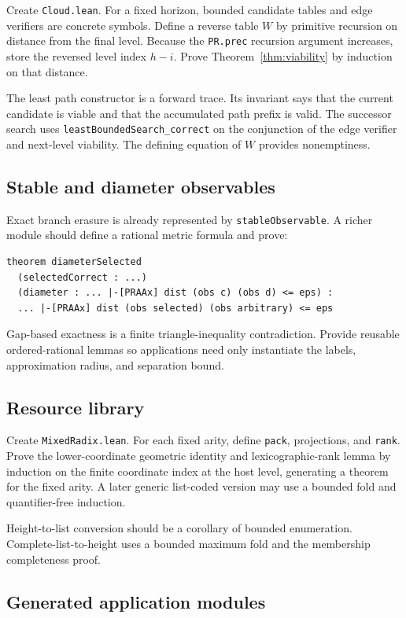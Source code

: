 Create \texttt{Cloud.lean}.  For a fixed horizon, bounded candidate tables and edge verifiers are concrete
symbols.  Define a reverse table \(W\) by primitive recursion on distance from the final level.  Because the
\texttt{PR.prec} recursion argument increases, store the reversed level index \(h-i\).  Prove
Theorem~\ref{thm:viability} by induction on that distance.

The least path constructor is a forward trace.  Its invariant says that the current candidate is viable and
that the accumulated path prefix is valid.  The successor search uses \texttt{leastBoundedSearch\_correct}
on the conjunction of the edge verifier and next-level viability.  The defining equation of \(W\) provides
nonemptiness.

\subsection{Stable and diameter observables}

Exact branch erasure is already represented by \texttt{stableObservable}.  A richer module should define a
rational metric formula and prove:
\begin{lstlisting}[language={}]
theorem diameterSelected
  (selectedCorrect : ...)
  (diameter : ... |-[PRAAx] dist (obs c) (obs d) <= eps) :
  ... |-[PRAAx] dist (obs selected) (obs arbitrary) <= eps
\end{lstlisting}
Gap-based exactness is a finite triangle-inequality contradiction.  Provide reusable ordered-rational
lemmas so applications need only instantiate the labels, approximation radius, and separation bound.

\subsection{Resource library}

Create \texttt{MixedRadix.lean}.  For each fixed arity, define \texttt{pack}, projections, and
\texttt{rank}.  Prove the lower-coordinate geometric identity and lexicographic-rank lemma by induction on
the finite coordinate index at the host level, generating a theorem for the fixed arity.  A later generic
list-coded version may use a bounded fold and quantifier-free induction.

Height-to-list conversion should be a corollary of bounded enumeration.  Complete-list-to-height uses a
bounded maximum fold and the membership completeness proof.

\subsection{Generated application modules}

